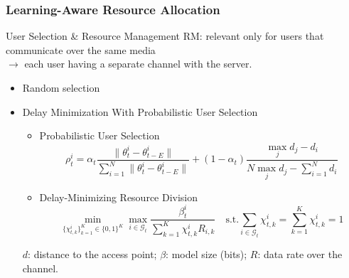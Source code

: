 
\begin{frame}
\frametitle{Learning-Aware Resource Allocation}

\begin{block}{User Selection \& {\color{red} Resource Management}}
{\smaller
{\color{red}\noindent RM: relevant only for users that communicate over the same media \\
$\to$ each user having a separate channel with the server.
}
}
\begin{itemize}
\item Random selection
\item Delay Minimization With Probabilistic User Selection
  \begin{itemize}
      \item Probabilistic User Selection
      \vspace{-0.5em}
      {\smaller
      $$\rho_t^i = \alpha_t \dfrac{\lVert \theta_t^i - \theta_{t-E}^i \rVert}{\sum\limits_{i=1}^N \lVert \theta_t^i - \theta_{t-E}^i \rVert} + (1-\alpha_t)\dfrac{\max_j d_j - d_i}{N\max_j d_j - \sum\limits_{i=1}^N d_i}$$
      }
      \vspace{-0.7em}
      \item Delay-Minimizing Resource Division
      \vspace{-1em}
      {\smaller
        $$
        \min_{\{\chi_{t,k}^i\}_{k=1}^K \in \{0, 1\}^K} \max_{i\in\mathcal{G}_t} \dfrac{\beta_t^i}{\sum\limits_{k=1}^K \chi_{t,k}^i R_{i,k}} \quad
        \text{s.t.} \sum\limits_{i\in\mathcal{G}_t} \chi_{t,k}^i = \sum\limits_{k=1}^K \chi_{t,k}^i = 1
        $$
        }
  \end{itemize}
  \vspace{-0.7em}
  {\smaller \color{red}
  $d$: distance to the access point; $\beta$: model size (bits); $R$: data rate over the channel.
  }
\end{itemize}
\end{block}

\end{frame}


